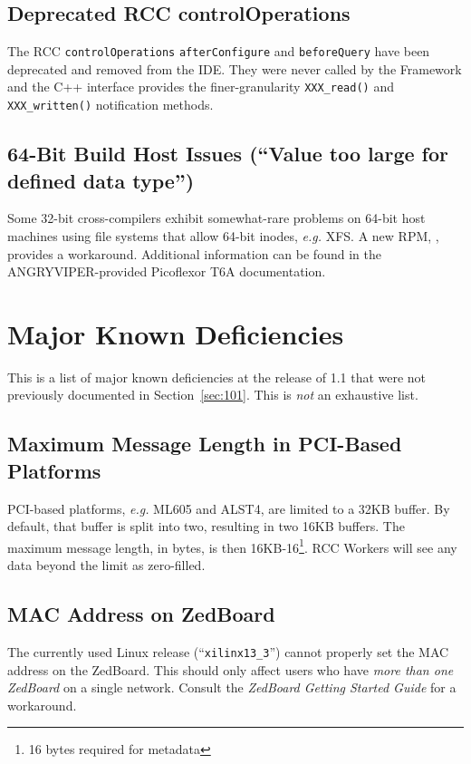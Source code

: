 \subsection{Deprecated RCC controlOperations}
The RCC \texttt{controlOperations} \texttt{afterConfigure} and \texttt{beforeQuery} have been deprecated and removed from the IDE. They were never called by the Framework and the C++ interface provides the finer-granularity \texttt{XXX\_read()} and \texttt{XXX\_written()} notification methods.

\subsection{64-Bit Build Host Issues (``Value too large for defined data type'')}
Some 32-bit cross-compilers exhibit somewhat-rare problems on 64-bit host machines using file systems that allow 64-bit inodes, \textit{e.g.} XFS. A new RPM, , provides a workaround. Additional information can be found in the ANGRYVIPER-provided Picoflexor T6A documentation.

\section{Major Known Deficiencies}
This is a list of major known deficiencies at the release of 1.1 that were not previously documented in Section~\ref{sec:101}. This is \textit{not} an exhaustive list.

\subsection{Maximum Message Length in PCI-Based Platforms}
\label{bug:1392}
PCI-based platforms, \textit{e.g.} ML605 and ALST4, are limited to a 32KB buffer. By default, that buffer is split into two, resulting in two 16KB buffers. The maximum message length, in bytes, is then 16KB-16\footnote{16 bytes required for metadata}. RCC Workers will see any data beyond the limit as zero-filled.

\subsection{MAC Address on ZedBoard}
\label{bug:2400}
The currently used Linux release (``\texttt{xilinx13\_3}'') cannot properly set the MAC address on the ZedBoard. This should only affect users who have \textit{more than one ZedBoard} on a single network. Consult the \textit{ZedBoard Getting Started Guide} for a workaround.

